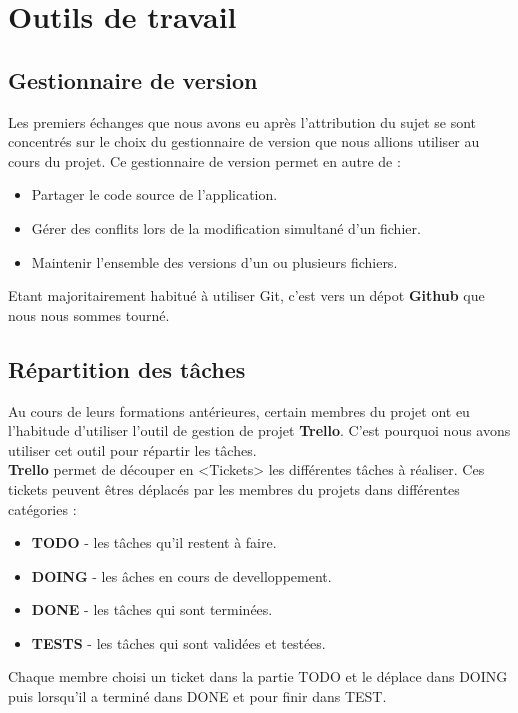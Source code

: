 \section{Outils de travail}

\subsection{Gestionnaire de version}
Les premiers échanges que nous avons eu après l'attribution du sujet se sont concentrés sur le choix du gestionnaire de version que nous allions utiliser au cours du projet. Ce gestionnaire de version permet en autre de :
\begin{itemize}
\item Partager le code source de l'application.
\item Gérer des conflits lors de la modification simultané d'un fichier.
\item Maintenir l'ensemble des versions d'un ou plusieurs fichiers.\\
\end{itemize}

Etant majoritairement habitué à utiliser Git, c'est vers un dépot \textbf{Github} que nous nous sommes tourné.

\subsection{Répartition des t\^aches}
Au cours de leurs formations antérieures, certain membres du projet ont eu l'habitude d'utiliser l'outil de gestion de projet \textbf{Trello}. C'est pourquoi nous avons utiliser cet outil pour répartir les t\^aches.\\

\textbf{Trello} permet de découper en <Tickets> les différentes t\^aches à réaliser. Ces tickets peuvent \^etres déplacés par les membres du projets dans différentes catégories :
\begin{itemize}
\item \textbf{TODO} - les t\^aches qu'il restent à faire. 
\item \textbf{DOING} - les \^aches en cours de develloppement.
\item \textbf{DONE} - les t\^aches qui sont terminées.
\item \textbf{TESTS} - les t\^aches qui sont validées et testées.\\
\end{itemize}
Chaque membre choisi un ticket dans la partie TODO et le déplace dans DOING puis lorsqu'il a terminé dans DONE et pour finir dans TEST.

